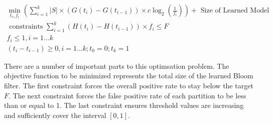 \documentclass[MScCS]{uccthesis}
\begin{document}
$$
    \begin{gathered}
        \min _{t_{i}, f_{i}}\left(\sum_{i=1}^{k}|S| \times\left(G\left(t_{i}\right)-G\left(t_{i-1}\right)\right) \times c \log _{2}\left(\frac{1}{f_{i}}\right)\right)+\text { Size of Learned Model } \\
        \text { constraints } \sum_{i=1}^{k}\left(H\left(t_{i}\right)-H\left(t_{i-1}\right)\right) \times f_{i} \leq F \\
        f_{i} \leq 1, i=1 \ldots k \\
        \left(t_{i}-t_{i-1}\right) \geq 0, i=1 \ldots k ; t_{0}=0 ; t_{k}=1
    \end{gathered}
$$

There are a number of important parts to this optimsation problem. The objective function to be minimized represents the total size of the learned Bloom filter. The first constraint forces the overall positive rate to stay below the target $F$. The next constraint forces the false positive rate of each partition to be less than or equal to 1. The last constraint ensures threshold values are increasing and sufficiently cover the interval $[0,1]$.



%
%
\backmatter
%
%
\printbibliography
\end{document}
